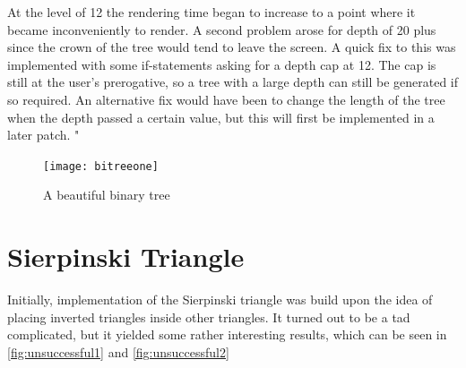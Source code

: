 \documentclass[titlepage]{article}
\begin{document}
At the level of 12 the rendering time began to increase to a point where it became inconveniently to render. A second problem arose for depth of 20 plus since the crown of the tree would tend to leave the screen. A quick fix to this was implemented with some if-statements asking for a depth cap at 12. The cap is still at the user’s prerogative, so a tree with a large depth can still be generated if so required. An alternative fix would have been to change the length of the tree when the depth passed a certain value, but this will first be implemented in a later patch. "
\begin{figure}[H]
  \centering
  \texttt{[image: bitreeone]}
  \caption{A beautiful binary tree}
  \label{fig:bitreeone}
\end{figure}

\section{Sierpinski Triangle}
Initially, implementation of the Sierpinski triangle was build upon the idea of placing inverted triangles inside other triangles. It turned out to be a tad complicated, but it yielded some rather interesting results, which can be seen in \ref{fig:unsuccessful1} and \ref{fig:unsuccessful2}
\end{document}
